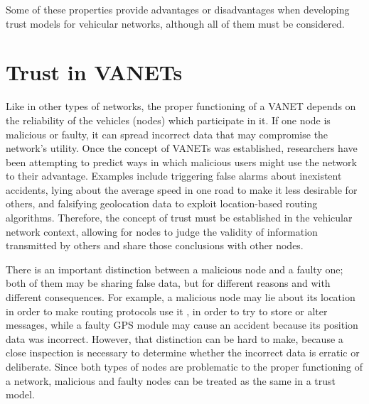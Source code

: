 Some of these properties provide advantages or disadvantages when developing trust models for vehicular networks, although all of them must be considered.

\section{Trust in VANETs}
\label{section:trustvanet}
Like in other types of networks, the proper functioning of a VANET depends on the reliability of the vehicles (nodes) which participate in it.
If one node is malicious or faulty, it can spread incorrect data that may compromise the network's utility.
Once the concept of VANETs was established, researchers have been attempting to predict ways in which malicious users might use the network to their advantage.
Examples include triggering false alarms about inexistent accidents, lying about the average speed in one road to make it less desirable for others, and falsifying geolocation data to exploit location-based routing algorithms. Therefore, the concept of trust must be established in the vehicular network context, allowing for nodes to judge the validity of information transmitted by others and share those conclusions with other nodes.

There is an important distinction between a malicious node and a faulty one; both of them may be sharing false data, but for different reasons and with different consequences.
For example, a malicious node may lie about its location in order to make routing protocols use it \cite{leinmuller2005influence}, in order to try to store or alter messages, while a faulty GPS module may cause an accident because its position data was incorrect.
However, that distinction can be hard to make, because a close inspection is necessary to determine whether the incorrect data is erratic or deliberate.
Since both types of nodes are problematic to the proper functioning of a network, malicious and faulty nodes can be treated as the same in a trust model.


